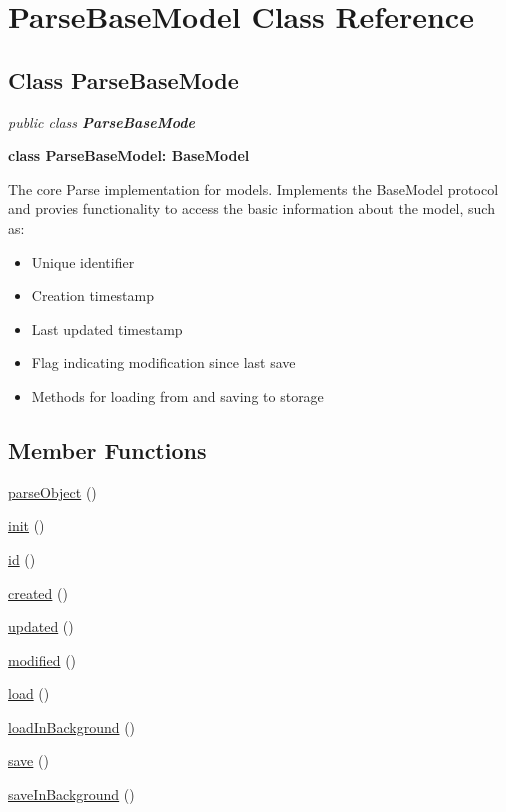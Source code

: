 
\hypertarget{class_ParseBaseModel.iOS}{\section{ParseBaseModel Class Reference}
\label{class_ParseBaseMode.iOS}
}

\subsection*{Class ParseBaseMode}

\textit{public class \textbf{ParseBaseMode}}

\tab \textbf{class ParseBaseModel: BaseModel}

The core Parse implementation for models. Implements the BaseModel protocol and provies functionality to access the basic information about the model, such as:\\
\begin{itemize}
\item Unique identifier
\item Creation timestamp
\item Last updated timestamp
\item Flag indicating modification since last save
\item Methods for loading from and saving to storage
\end{itemize}

\subsection*{Member Functions}
\begin{DoxyCompactItemize}
\item 
\hyperlink{class_ParseBaseModel.iOS.parseObject}{parseObject} ()
\item 
\hyperlink{class_ParseBaseModel.iOS.init}{init} ()
\item 
\hyperlink{class_ParseBaseModel.iOS.id}{id} ()
\item 
\hyperlink{class_ParseBaseModel.iOS.created}{created} ()
\item 
\hyperlink{class_ParseBaseModel.iOS.updated}{updated} ()
\item 
\hyperlink{class_ParseBaseModel.iOS.modified}{modified} ()
\item 
\hyperlink{class_ParseBaseModel.iOS.load}{load} ()
\item 
\hyperlink{class_ParseBaseModel.iOS.loadInBackground}{loadInBackground} ()
\item 
\hyperlink{class_ParseBaseModel.iOS.save}{save} ()
\item 
\hyperlink{class_ParseBaseModel.iOS.saveInBackground}{saveInBackground} ()
\end{DoxyCompactItemize}




